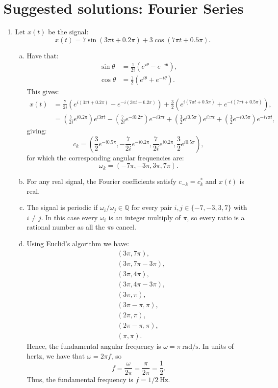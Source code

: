 \newpage
\section{Suggested solutions: Fourier Series}

\begin{enumerate}
\item Let $x(t)$ be the signal:
$$x(t)=7\sin(3\pi t+0.2\pi)+3\cos(7\pi t+0.5\pi).$$

\begin{enumerate}[a)]
\item Have that:
\begin{align*}
    \sin\theta&=\frac{1}{2i}(e^{i\theta}-e^{-i\theta}), \\
    \cos\theta&=\frac{1}{2}(e^{i\theta}+e^{-i\theta}).
\end{align*}
This gives:
\begin{align*}
    x(t)&=\frac{7}{2i}(e^{i(3\pi t+0.2\pi)}-e^{-i(3\pi t+0.2\pi)})+ \frac{3}{2}(e^{i(7\pi t+0.5\pi)}+e^{-i(7\pi t+0.5\pi)}), \\
    &=\left(\frac{7}{2i}e^{i0.2\pi}\right)e^{i3\pi t}-\left(\frac{7}{2i}e^{-i0.2\pi}\right)e^{-i3\pi t} + \left(\frac{3}{2}e^{i0.5\pi}\right)e^{i7\pi t}+\left(\frac{3}{2}e^{-i0.5\pi}\right)e^{-i7\pi t},
\end{align*}
giving:
$$c_{k}=\left(\frac{3}{2}e^{-i0.5\pi},-\frac{7}{2i}e^{-i0.2\pi},\frac{7}{2i}e^{i0.2\pi},\frac{3}{2}e^{i0.5\pi}\right),$$
for which the corresponding angular frequencies are:
$$\omega_{k}=(-7\pi,-3\pi,3\pi,7\pi).$$

\item For any real signal, the Fourier coefficients satisfy $c_{-k}=c_{k}^{*}$ and $x(t)$ is real. 

\item The signal is periodic if $\omega_{i}/\omega_{j}\in\mathbb{Q}$ for every pair $i,j\in \{-7,-3,3,7\}$ with $i\neq j$. In this case every $\omega_{i}$ is an integer multiply of $\pi$, so every ratio is a rational number as all the $\pi$s cancel.

\item Using Euclid's algorithm we have:
\begin{align*}
    &(3\pi,7\pi), \\
    &(3\pi,7\pi-3\pi), \\
    &(3\pi,4\pi), \\
    &(3\pi,4\pi-3\pi), \\
    &(3\pi,\pi), \\
    &(3\pi-\pi,\pi), \\
    &(2\pi,\pi), \\
    &(2\pi-\pi,\pi), \\
    &(\pi,\pi).
\end{align*}
Hence, the fundamental angular frequency is $\omega=\pi\ \text{rad/s}$. In units of hertz, we have that $\omega=2\pi f$, so
$$f=\frac{\omega}{2\pi}=\frac{\pi}{2\pi}=\frac{1}{2}.$$
Thus, the fundamental frequency is $f=1/2\ \text{Hz}$. 


\end{enumerate}
\end{enumerate}
